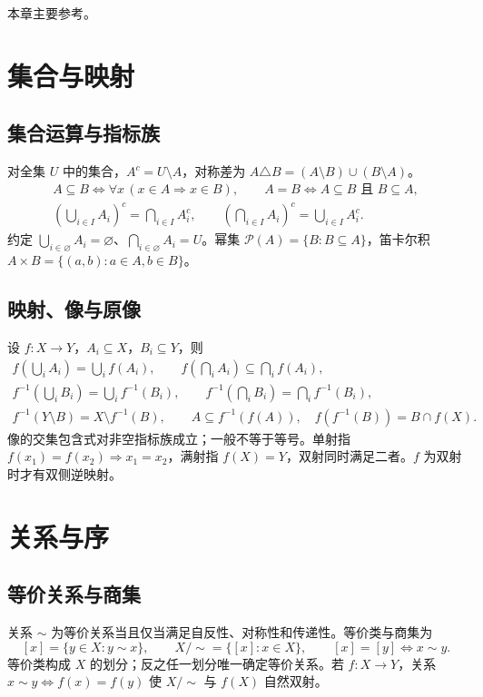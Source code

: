 \documentclass[../main.tex]{subfiles}
\begin{document}
本章主要参考\cite{weiss}。

\section{集合与映射}
\subsection{集合运算与指标族}
对全集 $U$ 中的集合，$A^c=U\setminus A$，对称差为 $A\triangle B=(A\setminus B)\cup(B\setminus A)$。
\begin{gather*}
A\subseteq B\iff\forall x\,(x\in A\Rightarrow x\in B),\qquad
A=B\iff A\subseteq B\text{ 且 }B\subseteq A,\\
\left(\bigcup_{i\in I}A_i\right)^c=\bigcap_{i\in I}A_i^c,\qquad
\left(\bigcap_{i\in I}A_i\right)^c=\bigcup_{i\in I}A_i^c.
\end{gather*}
约定 $\bigcup_{i\in\varnothing}A_i=\varnothing$、$\bigcap_{i\in\varnothing}A_i=U$。幂集 $\mathcal P(A)=\{B:B\subseteq A\}$，笛卡尔积 $A\times B=\{(a,b):a\in A,b\in B\}$。
\subsection{映射、像与原像}
设 $f:X\to Y$，$A_i\subseteq X$，$B_i\subseteq Y$，则
\begin{gather*}
f\!\left(\bigcup_iA_i\right)=\bigcup_if(A_i),\qquad
f\!\left(\bigcap_iA_i\right)\subseteq\bigcap_if(A_i),\\
f^{-1}\!\left(\bigcup_iB_i\right)=\bigcup_if^{-1}(B_i),\qquad
f^{-1}\!\left(\bigcap_iB_i\right)=\bigcap_if^{-1}(B_i),\\
f^{-1}(Y\setminus B)=X\setminus f^{-1}(B),\qquad
A\subseteq f^{-1}(f(A)),\quad f(f^{-1}(B))=B\cap f(X).
\end{gather*}
像的交集包含式对非空指标族成立；一般不等于等号。单射指 $f(x_1)=f(x_2)\Rightarrow x_1=x_2$，满射指 $f(X)=Y$，双射同时满足二者。$f$ 为双射时才有双侧逆映射。
\section{关系与序}
\subsection{等价关系与商集}
关系 $\sim$ 为等价关系当且仅当满足自反性、对称性和传递性。等价类与商集为
\[
[x]=\{y\in X:y\sim x\},\qquad X/{\sim}=\{[x]:x\in X\},\qquad
[x]=[y]\iff x\sim y.
\]
等价类构成 $X$ 的划分；反之任一划分唯一确定等价关系。若 $f:X\to Y$，关系 $x\sim y\iff f(x)=f(y)$ 使 $X/{\sim}$ 与 $f(X)$ 自然双射。
\end{document}
